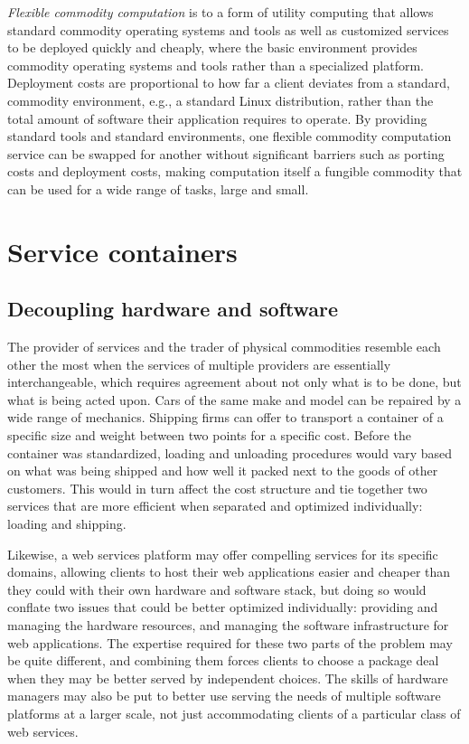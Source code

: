 \emph{Flexible commodity computation} is to a form of utility computing that allows standard commodity operating systems and tools as well as customized services to be deployed quickly and cheaply, where the basic environment provides commodity operating systems and tools rather than a specialized platform. Deployment costs are proportional to how far a client deviates from a standard, commodity environment, e.g., a standard Linux distribution, rather than the total amount of software their application requires to operate. By providing standard tools and standard environments, one flexible commodity computation service can be swapped for another without significant barriers such as porting costs and deployment costs, making computation itself a fungible commodity that can be used for a wide range of tasks, large and small.

\section{Service containers}

\subsection{Decoupling hardware and software}

The provider of services and the trader of physical commodities resemble each other the most when the services of multiple providers are essentially interchangeable, which requires agreement about not only what is to be done, but what is being acted upon. Cars of the same make and model can be repaired by a wide range of mechanics. Shipping firms can offer to transport a container of a specific size and weight between two points for a specific cost. Before the container was standardized, loading and unloading procedures would vary based on what was being shipped and how well it packed next to the goods of other customers. This would in turn affect the cost structure and tie together two services that are more efficient when separated and optimized individually: loading and shipping.

Likewise, a web services platform may offer compelling services for its specific domains, allowing clients to host their web applications easier and cheaper than they could with their own hardware and software stack, but doing so would conflate two issues that could be better optimized individually: providing and managing the hardware resources, and managing the software infrastructure for web applications. The expertise required for these two parts of the problem may be quite different, and combining them forces clients to choose a package deal when they may be better served by independent choices. The skills of hardware managers may also be put to better use serving the needs of multiple software platforms at a larger scale, not just accommodating clients of a particular class of web services.

